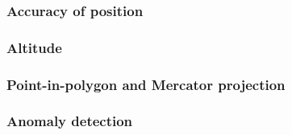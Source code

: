 \documentclass{article}
\begin{document}
\subsubsection{Accuracy of position}
\subsubsection{Altitude}
\subsubsection{Point-in-polygon and Mercator projection}
\subsubsection{Anomaly detection}



\newpage
\printbibliography
\end{document}
